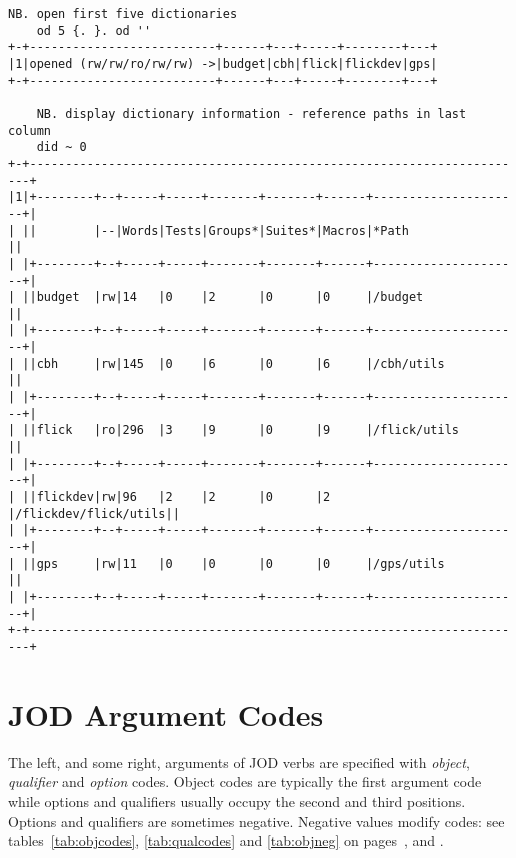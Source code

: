 \begin{lstlisting}[frame=single,framerule=0pt,basicstyle=\ttfamily\footnotesize]
    NB. open first five dictionaries 
    od 5 {. }. od ''
+-+--------------------------+------+---+-----+--------+---+
|1|opened (rw/rw/ro/rw/rw) ->|budget|cbh|flick|flickdev|gps|
+-+--------------------------+------+---+-----+--------+---+

    NB. display dictionary information - reference paths in last column
    did ~ 0
+-+----------------------------------------------------------------------+
|1|+--------+--+-----+-----+-------+-------+------+---------------------+|
| ||        |--|Words|Tests|Groups*|Suites*|Macros|*Path                ||
| |+--------+--+-----+-----+-------+-------+------+---------------------+|
| ||budget  |rw|14   |0    |2      |0      |0     |/budget              ||
| |+--------+--+-----+-----+-------+-------+------+---------------------+|
| ||cbh     |rw|145  |0    |6      |0      |6     |/cbh/utils           ||
| |+--------+--+-----+-----+-------+-------+------+---------------------+|
| ||flick   |ro|296  |3    |9      |0      |9     |/flick/utils         ||
| |+--------+--+-----+-----+-------+-------+------+---------------------+|
| ||flickdev|rw|96   |2    |2      |0      |2     |/flickdev/flick/utils||
| |+--------+--+-----+-----+-------+-------+------+---------------------+|
| ||gps     |rw|11   |0    |0      |0      |0     |/gps/utils           ||
| |+--------+--+-----+-----+-------+-------+------+---------------------+|
+-+----------------------------------------------------------------------+
\end{lstlisting}
   
   \newpage
   \section{JOD Argument Codes}\label{ap:objqualcodes}

The left, and some right, arguments of JOD verbs are specified with \emph{object}, \emph{qualifier} and \emph{option} codes. Object codes are typically the first argument code while options and qualifiers usually occupy the second and third positions. Options and qualifiers are sometimes negative. Negative values modify codes: see tables~\ref{tab:objcodes}, \ref{tab:qualcodes} and
\ref{tab:objneg} on 
pages~\pageref{tab:objcodes}, \pageref{tab:qualcodes} and \pageref{tab:objneg}.

